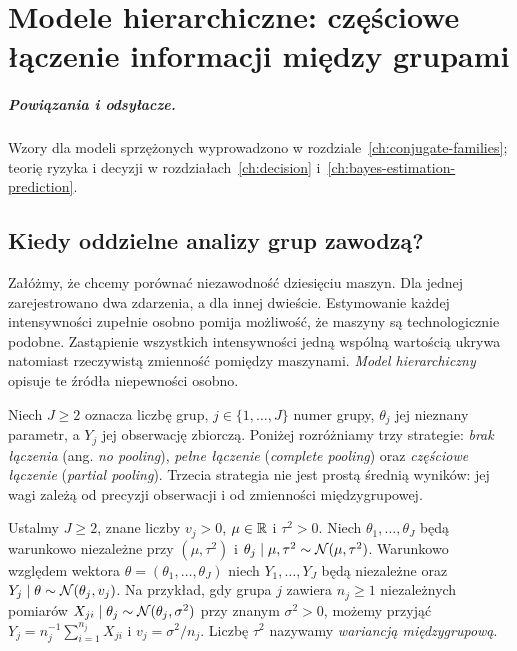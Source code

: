 \chapter{Modele hierarchiczne: częściowe łączenie informacji między grupami}
\label{ch:hierarchical-bayes}
\paragraph{Powiązania i odsyłacze.} Wzory dla modeli sprzężonych wyprowadzono w rozdziale~\ref{ch:conjugate-families}; teorię ryzyka i decyzji w rozdziałach~\ref{ch:decision} i~\ref{ch:bayes-estimation-prediction}.


\section{Kiedy oddzielne analizy grup zawodzą?}
Załóżmy, że chcemy porównać niezawodność dziesięciu maszyn.
Dla jednej zarejestrowano dwa zdarzenia, a dla innej dwieście.
Estymowanie każdej intensywności zupełnie osobno pomija możliwość,
że maszyny są technologicznie podobne. Zastąpienie wszystkich
intensywności jedną wspólną wartością ukrywa natomiast rzeczywistą
zmienność pomiędzy maszynami. \emph{Model hierarchiczny} opisuje te
źródła niepewności osobno.

Niech $J\ge2$ oznacza liczbę grup, $j\in\{1,\ldots,J\}$ numer grupy,
$\theta_j$ jej nieznany parametr, a $Y_j$ jej obserwację zbiorczą.
Poniżej rozróżniamy trzy strategie: \emph{brak łączenia}
(ang. \emph{no pooling}), \emph{pełne łączenie}
(\emph{complete pooling}) oraz \emph{częściowe łączenie}
(\emph{partial pooling}). Trzecia strategia nie jest prostą średnią
wyników: jej wagi zależą od precyzji obserwacji i od zmienności
międzygrupowej.

\begin{definicja}
\label{def:normal-hierarchical}
Ustalmy $J\ge2$, znane liczby $v_j>0$, $\mu\in\mathbb R$ i $\tau^2>0$.
Niech $\theta_1,\ldots,\theta_J$ będą warunkowo niezależne przy
$(\mu,\tau^2)$ i $\theta_j\mid\mu,\tau^2\sim\mathcal N(\mu,\tau^2)$.
Warunkowo względem wektora $\theta=(\theta_1,\ldots,\theta_J)$
niech $Y_1,\ldots,Y_J$ będą niezależne oraz
$Y_j\mid\theta\sim\mathcal N(\theta_j,v_j)$.
Na przykład, gdy grupa $j$ zawiera $n_j\ge1$ niezależnych
pomiarów $X_{ji}\mid\theta_j\sim\mathcal N(\theta_j,\sigma^2)$
przy znanym $\sigma^2>0$, możemy przyjąć
$Y_j=n_j^{-1}\sum_{i=1}^{n_j}X_{ji}$ i $v_j=\sigma^2/n_j$.
Liczbę $\tau^2$ nazywamy \emph{wariancją międzygrupową}.
\end{definicja}

